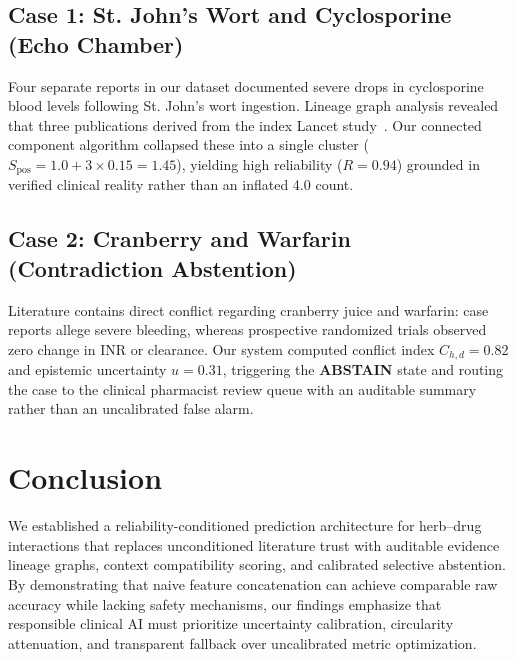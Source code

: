 \documentclass[10pt,journal,compsoc]{IEEEtran}
\begin{document}
\subsection{Case 1: St. John's Wort and Cyclosporine (Echo Chamber)}
Four separate reports in our dataset documented severe drops in cyclosporine blood levels following St. John's wort ingestion. Lineage graph analysis revealed that three publications derived from the index Lancet study~\cite{ruschitzka1999stjohns}. Our connected component algorithm collapsed these into a single cluster ($S_{\text{pos}} = 1.0 + 3 \times 0.15 = 1.45$), yielding high reliability ($R = 0.94$) grounded in verified clinical reality rather than an inflated 4.0 count.

\subsection{Case 2: Cranberry and Warfarin (Contradiction Abstention)}
Literature contains direct conflict regarding cranberry juice and warfarin: case reports allege severe bleeding, whereas prospective randomized trials observed zero change in INR or clearance. Our system computed conflict index $C_{h,d} = 0.82$ and epistemic uncertainty $u = 0.31$, triggering the \textbf{ABSTAIN} state and routing the case to the clinical pharmacist review queue with an auditable summary rather than an uncalibrated false alarm.

\section{Conclusion}
We established a reliability-conditioned prediction architecture for herb--drug interactions that replaces unconditioned literature trust with auditable evidence lineage graphs, context compatibility scoring, and calibrated selective abstention. By demonstrating that naive feature concatenation can achieve comparable raw accuracy while lacking safety mechanisms, our findings emphasize that responsible clinical AI must prioritize uncertainty calibration, circularity attenuation, and transparent fallback over uncalibrated metric optimization.



\end{document}
